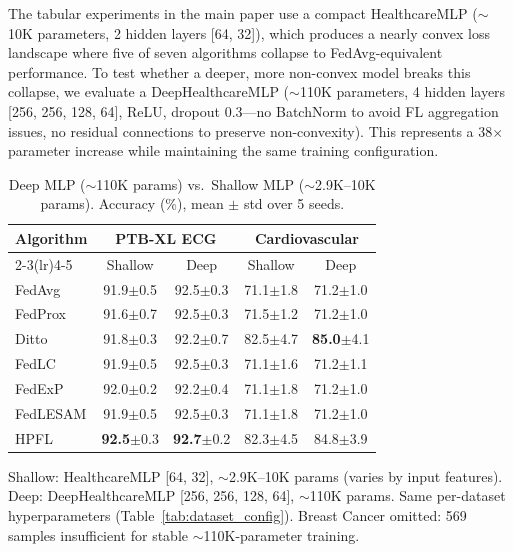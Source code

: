 \documentclass[conference,a4paper]{IEEEtran}
\begin{document}
The tabular experiments in the main paper use a compact HealthcareMLP ($\sim$10K parameters, 2 hidden layers [64, 32]), which produces a nearly convex loss landscape where five of seven algorithms collapse to FedAvg-equivalent performance. To test whether a deeper, more non-convex model breaks this collapse, we evaluate a DeepHealthcareMLP ($\sim$110K parameters, 4 hidden layers [256, 256, 128, 64], ReLU, dropout 0.3---no BatchNorm to avoid FL aggregation issues, no residual connections to preserve non-convexity). This represents a 38$\times$ parameter increase while maintaining the same training configuration.

\begin{table}[htbp]
\centering
\caption{Deep MLP ($\sim$110K params) vs.\ Shallow MLP ($\sim$2.9K--10K params). Accuracy (\%), mean $\pm$ std over 5 seeds.}
\label{tab:deep_mlp}
\small
\begin{tabular}{lcccc}
\toprule
\textbf{Algorithm} & \multicolumn{2}{c}{\textbf{PTB-XL ECG}} & \multicolumn{2}{c}{\textbf{Cardiovascular}} \\
\cmidrule(lr){2-3}\cmidrule(lr){4-5}
 & Shallow & Deep & Shallow & Deep \\
\midrule
FedAvg & 91.9{\tiny$\pm$0.5} & 92.5{\tiny$\pm$0.3} & 71.1{\tiny$\pm$1.8} & 71.2{\tiny$\pm$1.0} \\
FedProx & 91.6{\tiny$\pm$0.7} & 92.5{\tiny$\pm$0.3} & 71.5{\tiny$\pm$1.2} & 71.2{\tiny$\pm$1.0} \\
Ditto & 91.8{\tiny$\pm$0.3} & 92.2{\tiny$\pm$0.7} & 82.5{\tiny$\pm$4.7} & \textbf{85.0}{\tiny$\pm$4.1} \\
FedLC & 91.9{\tiny$\pm$0.5} & 92.5{\tiny$\pm$0.3} & 71.1{\tiny$\pm$1.6} & 71.2{\tiny$\pm$1.1} \\
FedExP & 92.0{\tiny$\pm$0.2} & 92.2{\tiny$\pm$0.4} & 71.1{\tiny$\pm$1.8} & 71.2{\tiny$\pm$1.0} \\
FedLESAM & 91.9{\tiny$\pm$0.5} & 92.5{\tiny$\pm$0.3} & 71.1{\tiny$\pm$1.8} & 71.2{\tiny$\pm$1.0} \\
HPFL & \textbf{92.5}{\tiny$\pm$0.3} & \textbf{92.7}{\tiny$\pm$0.2} & 82.3{\tiny$\pm$4.5} & 84.8{\tiny$\pm$3.9} \\
\bottomrule
\end{tabular}

\vspace{1mm}
\footnotesize{Shallow: HealthcareMLP [64, 32], $\sim$2.9K--10K params (varies by input features). Deep: DeepHealthcareMLP [256, 256, 128, 64], $\sim$110K params. Same per-dataset hyperparameters (Table~\ref{tab:dataset_config}). Breast Cancer omitted: 569 samples insufficient for stable $\sim$110K-parameter training.}
\end{table}
\end{document}
